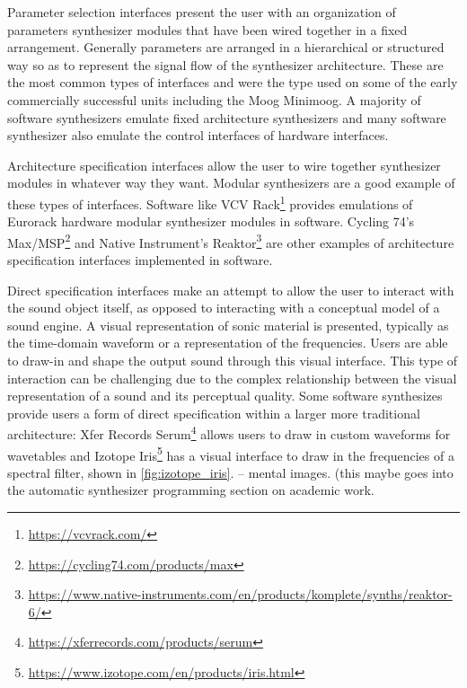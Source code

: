 Parameter selection interfaces present the user with an organization of parameters synthesizer modules that have been wired together in a fixed arrangement. Generally parameters are arranged in a hierarchical or structured way so as to represent the signal flow of the synthesizer architecture. These are the most common types of interfaces and were the type used on some of the early commercially successful units including the Moog Minimoog. A majority of software synthesizers emulate fixed architecture synthesizers and many software synthesizer also emulate the control interfaces of hardware interfaces. 

Architecture specification interfaces allow the user to wire together synthesizer modules in whatever way they want. Modular synthesizers are a good example of these types of interfaces. Software like VCV Rack\footnote{\url{https://vcvrack.com/}} provides emulations of Eurorack \cite{intellijel2019} hardware modular synthesizer modules in software. Cycling 74's Max/MSP\footnote{\url{https://cycling74.com/products/max}} and Native Instrument's Reaktor\footnote{\url{https://www.native-instruments.com/en/products/komplete/synths/reaktor-6/}} are other examples of architecture specification interfaces implemented in software.

Direct specification interfaces make an attempt to allow the user to interact with the sound object itself, as opposed to interacting with a conceptual model of a sound engine. A visual representation of sonic material is presented, typically as the time-domain waveform or a representation of the frequencies. Users are able to draw-in and shape the output sound through this visual interface. This type of interaction can be challenging due to the complex relationship between the visual representation of a sound and its perceptual quality. Some software synthesizes provide users a form of direct specification within a larger more traditional architecture: Xfer Records Serum\footnote{\url{https://xferrecords.com/products/serum}} allows users to draw in custom waveforms for wavetables and Izotope Iris\footnote{\url{https://www.izotope.com/en/products/iris.html}} has a visual interface to draw in the frequencies of a spectral filter, shown in \ref{fig:izotope_iris}. \cite{knees2016searching} -- mental images. (this maybe goes into the automatic synthesizer programming section on academic work.

